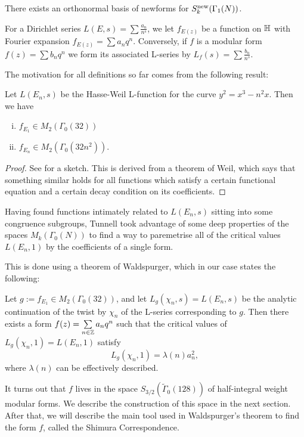 \documentclass[12pt, a4paper]{report}
\begin{document}
\begin{prop}
  There exists an orthonormal basis of newforms for $S_k^{\textnormal{new}}(\Gamma_1(N))$.
\end{prop}

For a Dirichlet series $L(E, s) = \sum \frac{a_n}{n^s}$, we let $f_{E(z)}$ be a
function on $\mathbb{H}$ with Fourier expansion $f_{E(z)} = \sum a_n q^n.$ Conversely,
if $f$ is a modular form $f(z) = \sum b_n q^n$ we form its associated L-series
by $L_f(s) = \sum \frac{b_n}{n^s}.$

The motivation for all definitions so far comes from the following result:

\begin{prop}
  Let $L(E_n,s)$ be the Hasse-Weil L-function for the curve $y^2 = x^3-n^2x$.
  Then we have
  \begin{enumerate}[(i)]
  \item $f_{E_1} \in M_2(\Gamma_0(32))$
  \item $f_{E_n} \in M_2(\Gamma_0(32n^2))$.
  \end{enumerate}
\end{prop}
\begin{proof}
  See \cite[Pages 140-143]{koblitz} for a sketch. This is derived from a theorem
  of Weil, which says that something similar holds for all functions which satisfy
  a certain functional equation and a certain decay condition on its
  coefficients.
\end{proof}

Having found functions intimately related to $L(E_n,s)$ sitting into some
congruence subgroups, Tunnell took advantage of some deep properties of the
spaces $M_k(\Gamma_0(N))$ to find a way to paremetrise all of the critical
values $L(E_n,1)$ by the coefficients of a single form.

This is done using a theorem of Waldspurger, which in our case states the
following:

Let $g := f_{E_1} \in M_2(\Gamma_0(32))$, and let $L_g(\chi_n, s) = L(E_n,s)$
be the analytic continuation of the twist by $\chi_n$ of the L-series
corresponding to $g$. 
Then there exists a form $f(z) = \sum\limits_{n \in {\mathbb Z}} a_nq^n$ 
such that the critical values of
$L_g(\chi_n,1) = L(E_n,1)$ satisfy
\[L_g(\chi_n,1) = \lambda(n) a_n^2,\]
where $\lambda(n)$ can be effectively described.

It turns out that $f$ lives in the space $S_{3/2}(\tilde{\Gamma}_0(128))$ of
half-integral weight modular forms. We describe the construction of this space
in the next section. After that, we will describe the main tool used in
Waldspurger's theorem to find the form $f$, called the Shimura Correspondence.
\end{document}
